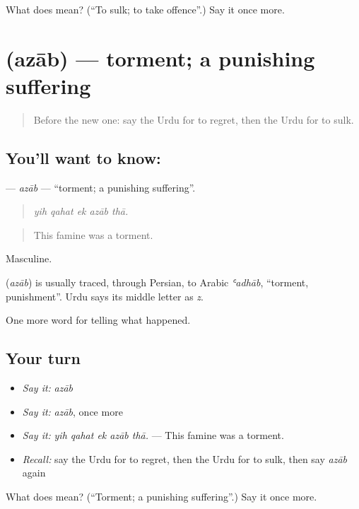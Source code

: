 \begin{tcolorbox}[breakable,colback=teal!4,colframe=teal!35!black,title={Before you move on}]
What does  mean? (\textquotedblleft{}To sulk; to take offence\textquotedblright{}.) Say it once more.
\end{tcolorbox}
\section[\texorpdfstring{\ur{عذاب} (azāb)}{عذاب (azāb)}]{ (azāb) — torment; a punishing suffering}

\label{lesson:UR-C326-azab}



\begin{quote}
Before the new one: say the Urdu for to regret, then the Urdu for to sulk.
\end{quote}

\subsection*{You'll want to know: }
\textbf{} — \emph{azāb} — \textquotedblleft{}torment; a punishing suffering\textquotedblright{}.

\begin{quote}
    
\end{quote}

\begin{quote}
\emph{yih qahat ek azāb thā.}
\end{quote}

\begin{quote}
This famine was a torment.
\end{quote}

Masculine.

\begin{cousinweb}
\textbf{} (\emph{azāb}) is usually traced, through Persian, to Arabic \emph{ʿadhāb}, \textquotedblleft{}torment, punishment\textquotedblright{}. Urdu says its middle letter as \emph{z}.
\end{cousinweb}

\begin{grammarlens}[title={What you've built}]
One more word for telling what happened.
\end{grammarlens}

\subsection*{Your turn}
\begin{itemize}
\raggedright
  \item \emph{Say it:} \emph{azāb}
  \item \emph{Say it:} \emph{azāb}, once more
  \item \emph{Say it:} \emph{yih qahat ek azāb thā.} — This famine was a torment.
  \item \emph{Recall:} say the Urdu for to regret, then the Urdu for to sulk, then say \emph{azāb} again
\end{itemize}

\begin{tcolorbox}[breakable,colback=teal!4,colframe=teal!35!black,title={Before you move on}]
What does  mean? (\textquotedblleft{}Torment; a punishing suffering\textquotedblright{}.) Say it once more.
\end{tcolorbox}
